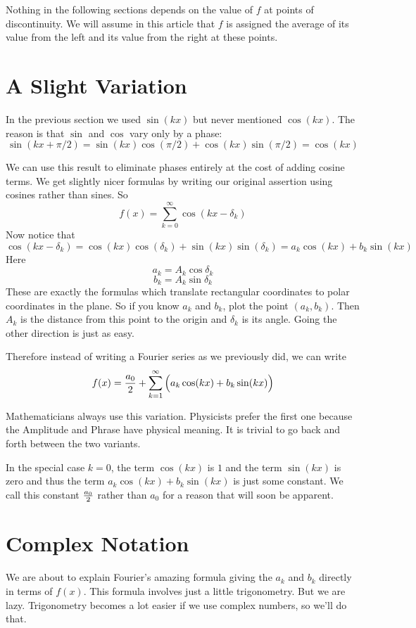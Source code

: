 \documentclass[11pt, oneside]{amsart}
\begin{document}
Nothing in the following sections depends on the value of $f$ at points of discontinuity. We will assume in this article that $f$ is assigned the average of its value from the left and its value from the right at these points.


\section{A Slight Variation}

In the previous section we used $\sin(kx)$ but never mentioned $\cos(kx)$. 
The reason is that $\sin$ and $\cos$ vary only by a phase: 
$$\sin(kx + {\pi / 2} ) = \sin(kx) \cos (\pi / 2) + \cos(kx) \sin(\pi / 2) = \cos(kx)$$ 

We can use this result to eliminate phases entirely at the cost of adding cosine terms. We get slightly nicer formulas by writing our original assertion using cosines rather than sines. So
$$f(x) = \sum_{k = 0}^\infty \cos(kx - \delta_k)$$
Now notice that
$$\cos(kx - \delta_k) = \cos(kx) \cos(\delta_k) + \sin(kx) \sin(\delta_k) = a_k \cos(kx)  + b_k \sin(kx)$$
Here
$$a_k = A_k \cos \delta_k$$
$$b_k = A_k \sin \delta_k$$
These are exactly the formulas which translate rectangular coordinates to polar coordinates in the plane. So if you know $a_k$ and $b_k$, plot the point $(a_k, b_k)$. Then $A_k$ is the distance from this point to the origin and $\delta_k$ is its angle. Going the other direction is just as easy. 

Therefore instead of writing a Fourier series as we previously did, we can write
$$f(x) = {{a_0} \over 2} + \sum_{k = 1}^\infty \Big( a_k \cos(kx) + b_k \sin(kx) \Big)$$

Mathematicians always use this variation. Physicists prefer the first one because the Amplitude and Phrase have physical meaning. It is trivial to go back and forth between the two variants.

In the special case $k = 0$, the term $\cos(kx)$ is $1$ and the term $\sin(kx)$ is zero and thus the term
$a_k \cos(kx) + b_k \sin(kx)$ is just some constant. We call this constant ${{a_0} \over 2}$ rather than $a_0$ for a reason that will soon be apparent.

\section{Complex Notation}

We are about to explain Fourier's amazing formula giving the $a_k$ and $b_k$ directly in terms of $f(x)$. This formula involves just a little trigonometry. But we are lazy. Trigonometry becomes a lot easier if we use complex numbers, so we'll do that.
\newpage
\end{document}
